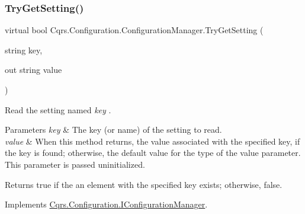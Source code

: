 \mbox{\label{classCqrs_1_1Configuration_1_1ConfigurationManager_ad87af2a011af065d6d3e0d2ff01c7f6e_ad87af2a011af065d6d3e0d2ff01c7f6e}} 
\subsubsection{\texorpdfstring{Try\+Get\+Setting()}{TryGetSetting()}\hspace{0.1cm}{\footnotesize\ttfamily [1/2]}}
{\footnotesize\ttfamily virtual bool Cqrs.\+Configuration.\+Configuration\+Manager.\+Try\+Get\+Setting (\begin{DoxyParamCaption}\item[{string}]{key,  }\item[{out string}]{value }\end{DoxyParamCaption})\hspace{0.3cm}{\ttfamily [virtual]}}



Read the setting named {\itshape key} . 


\begin{DoxyParams}{Parameters}
{\em key} & The key (or name) of the setting to read.\\
\hline
{\em value} & When this method returns, the value associated with the specified key, if the key is found; otherwise, the default value for the type of the value parameter. This parameter is passed uninitialized.\\
\hline
\end{DoxyParams}
\begin{DoxyReturn}{Returns}
true if the an element with the specified key exists; otherwise, false.
\end{DoxyReturn}


Implements \hyperlink{interfaceCqrs_1_1Configuration_1_1IConfigurationManager_ac4478405e3d9e1c97d14953aea4e695b_ac4478405e3d9e1c97d14953aea4e695b}{Cqrs.\+Configuration.\+I\+Configuration\+Manager}.

\mbox{\label{classCqrs_1_1Configuration_1_1ConfigurationManager_a40810d0b9fd2f3d1c4a270681e908c84_a40810d0b9fd2f3d1c4a270681e908c84}} 
